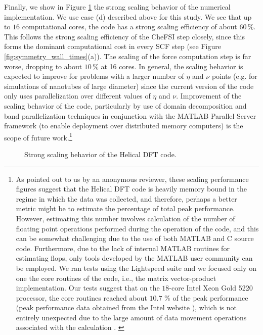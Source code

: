 \documentclass[preprint,12pt, 3p, sort&compress]{elsarticle}
\begin{document}
Finally, we show in Figure \ref{fig:strong_scaling} the strong scaling behavior of the numerical implementation. We use case (d) described above for this study. We see that up to $16$ computational cores, the code has a strong scaling efficiency of about $60\,\%$. This follows the strong scaling efficiency of the CheFSI step closely, since this forms the dominant computational cost in every SCF step (see Figure \ref{fig:symmetry_wall_times}(a)). The scaling of the force computation step is far worse, dropping to about $10\,\%$ at 16 cores.  In general, the scaling behavior is expected to improve  for problems with a larger number of $\eta$ and $\nu$ points (e.g. for simulations of nanotubes of large diameter) since the current version of the code only uses parallelization over different values of $\eta$ and $\nu$. Improvement of the scaling behavior of the code, particularly by use of domain decomposition and band parallelization techniques in conjunction with the MATLAB Parallel Server framework (to enable deployment over distributed memory computers) is the scope of future work.\footnote{{As pointed out to us by an anonymous reviewer, these scaling performance figures suggest that the Helical DFT  code is heavily memory bound in the regime in which the data was collected, and therefore, perhaps a better metric might be to estimate the percentage of total peak performance. However, estimating this number involves calculation of the number of floating point operations performed during the operation of the code, and this can be somewhat challenging due to the use of both MATLAB and} {C source code. Furthermore, due to the lack of internal MATLAB routines for estimating flops, only tools developed by the MATLAB user community can be employed. We ran tests using the Lightspeed suite \citep{Lightspeed} and we focused only on one the core routines of the code, i.e., the matrix vector-product implementation. Our tests suggest that on the  $18$-core Intel Xeon Gold 5220 processor, the core routines reached about $10.7$ \% of the peak performance (peak performance data obtained from the Intel website \citep{Intel_Web}), which is not entirely unexpected due to the large amount of data movement operations associated with the calculation \citep{Lecture_Gropp}.
}}
\begin{figure}
\centering
{}
\caption{\footnotesize{Strong scaling behavior of the Helical DFT code.}}
\label{fig:strong_scaling}
\end{figure}
\end{document}
